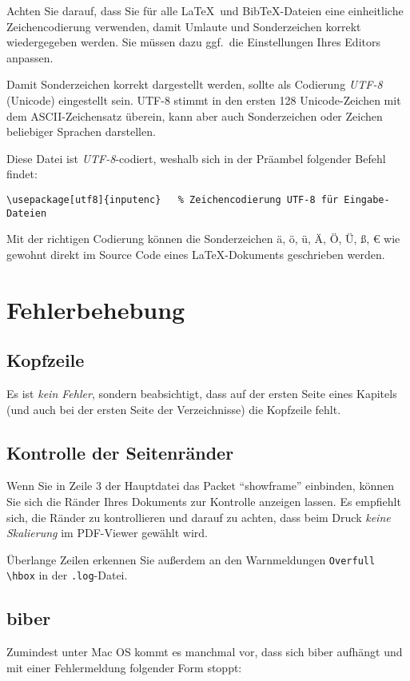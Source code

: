 Achten Sie darauf, dass Sie für alle \LaTeX\ und BibTeX-Dateien eine einheitliche Zeichencodierung verwenden, damit Umlaute und Sonderzeichen korrekt wiedergegeben werden. Sie müssen dazu ggf.\ die Einstellungen Ihres Editors anpassen.

Damit Sonderzeichen korrekt dargestellt werden, sollte als Codierung \emph{UTF-8} (Unicode) eingestellt sein. UTF-8 stimmt in den ersten 128 Unicode-Zeichen mit dem ASCII-Zeichensatz überein, kann aber auch Sonderzeichen oder Zeichen beliebiger Sprachen darstellen.

Diese Datei ist \emph{UTF-8}-codiert, weshalb sich in der Präambel folgender Befehl findet:
\lstset{language=TeX} 
\begin{lstlisting}
\usepackage[utf8]{inputenc}   % Zeichencodierung UTF-8 für Eingabe-Dateien
\end{lstlisting}

Mit der richtigen Codierung können die Sonderzeichen ä, ö, ü, Ä, Ö, Ü, ß, € wie gewohnt direkt im Source Code eines \LaTeX-Dokuments geschrieben werden.

\section{Fehlerbehebung}

\subsection{Kopfzeile}
Es ist \emph{kein Fehler}, sondern beabsichtigt, dass auf der ersten Seite eines Kapitels (und auch bei der ersten Seite der Verzeichnisse) die Kopfzeile fehlt.

\subsection{Kontrolle der Seitenränder}
Wenn Sie in Zeile 3 der Hauptdatei das Packet \enquote{showframe} einbinden, können Sie sich die Ränder Ihres Dokuments zur Kontrolle anzeigen lassen. Es empfiehlt sich, die Ränder zu kontrollieren und darauf zu achten, dass beim Druck \emph{keine Skalierung} im PDF-Viewer gewählt wird.  

Überlange Zeilen erkennen Sie außerdem an den Warnmeldungen \verb|Overfull \hbox| in der \verb|.log|-Datei.

\subsection{biber}
Zumindest unter Mac OS kommt es manchmal vor, dass sich biber aufhängt und mit einer Fehlermeldung folgender Form stoppt:

